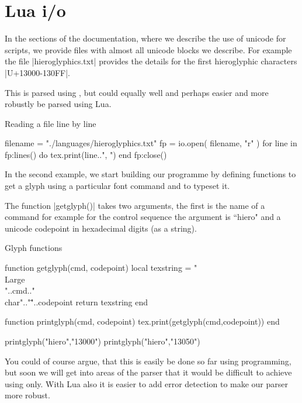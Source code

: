 \chapter{Lua i/o}
\label{ch:luaio}
\newfontfamily{}

In the sections of the documentation, where we describe
the use of unicode for scripts, we provide files with almost
all unicode blocks we describe. For example the file
|hieroglyphics.txt| provides the details for the first
hieroglyphic characters |U+13000-130FF|.

This is parsed using \tex, but could equally well and perhaps easier and more robustly be parsed using Lua.  


\begin{texexample}{Reading a file line by line}{}
\begin{luacode*}
filename = "./languages/hieroglyphics.txt"
fp = io.open( filename, "r" )
for line in fp:lines() do
    tex.print(line..", ")
   end
fp:close()
\end{luacode*}
\end{texexample}

In the second example, we start building our programme
by defining functions to get a glyph using a particular font
command and to typeset it.

The function |getglyph()| takes two arguments, the first is the
name of a command for example for the control sequence \cmd{\hiero} the argument is  ``hiero" and a unicode codepoint in hexadecimal digits (as a string).

\begin{texexample}{Glyph functions}{}
\begin{luacode*}
function getglyph(cmd, codepoint)
  local texstring = "\\Large\\"..cmd.." \\char".."\""..codepoint
  return texstring
end

function printglyph(cmd, codepoint)
  tex.print(getglyph(cmd,codepoint))
end

printglyph("hiero","13000")
printglyph("hiero","13050")
\end{luacode*}
\end{texexample}

You could of course argue, that this is easily be done so far using \tex programming, but soon we will get into areas of the parser that it would be difficult to achieve using \tex only. With Lua also it is easier to add error detection to make our parser more robust.

